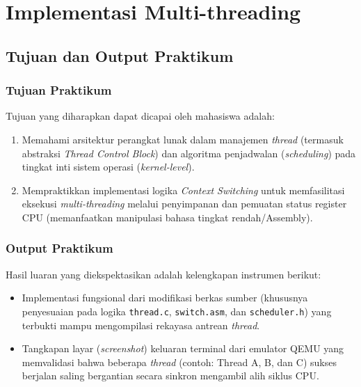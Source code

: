 
\chapter{Implementasi Multi-threading}
\label{chap:modul-08}

\section{Tujuan dan Output Praktikum}

\subsection{Tujuan Praktikum}
Tujuan yang diharapkan dapat dicapai oleh mahasiswa adalah:
\begin{enumerate}
    \item Memahami arsitektur perangkat lunak dalam manajemen \textit{thread} (termasuk abstraksi \textit{Thread Control Block}) dan algoritma penjadwalan (\textit{scheduling}) pada tingkat inti sistem operasi (\textit{kernel-level}).
    \item Mempraktikkan implementasi logika \textit{Context Switching} untuk memfasilitasi eksekusi \textit{multi-threading} melalui penyimpanan dan pemuatan status register CPU (memanfaatkan manipulasi bahasa tingkat rendah/Assembly).
\end{enumerate}

\subsection{Output Praktikum}
Hasil luaran yang diekspektasikan adalah kelengkapan instrumen berikut:
\begin{itemize}
    \item Implementasi fungsional dari modifikasi berkas sumber (khususnya penyesuaian pada logika \texttt{thread.c}, \texttt{switch.asm}, dan \texttt{scheduler.h}) yang terbukti mampu mengompilasi rekayasa antrean \textit{thread}.
    \item Tangkapan layar (\textit{screenshot}) keluaran terminal dari emulator QEMU yang memvalidasi bahwa beberapa \textit{thread} (contoh: Thread A, B, dan C) sukses berjalan saling bergantian secara sinkron mengambil alih siklus CPU.
\end{itemize}

